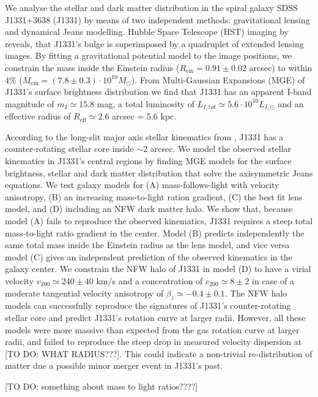 We analyse the stellar and dark matter distribution in the spiral galaxy SDSS J1331+3638 (J1331) by means of two independent methods: gravitational lensing and dynamical Jeans modelling. Hubble Space Telescope (HST) imaging by \citet{SWELLSI} reveals, that J1331's bulge is superimposed by a quadruplet of extended lensing images. By fitting a gravitational potential model to the image positions, we constrain the mass inside the Einstein radius ($R_\text{ein}=0.91\pm0.02$ arcsec) to within 4\% ($M_\text{ein} = (7.8\pm0.3) \cdot 10^{10} M_\odot$). From Multi-Gaussian Expansions (MGE) of J1331's surface brightness distribution we find that J1331 has an apparent I-band magnitude of $m_I \simeq 15.8$ mag, a total luminosity of $L_{I,tot} \simeq 5.6 \cdot 10^{10}L_{I,\odot}$ and an effective radius of $R_\text{eff} \simeq 2.6$ arcsec = 5.6 kpc.

According to the long-slit major axis stellar kinematics from \citet{SWELLSV}, J1331 has a counter-rotating stellar core inside $\sim 2$ arcsec. We model the observed stellar kinematics in J1331's central regions by finding MGE models for the surface brightness, stellar and dark matter distribution that solve the axisymmetric Jeans equations. We test galaxy models for (A) mass-follows-light with velocity anisotropy, (B) an increasing mass-to-light ration gradient, (C) the best fit lens model, and (D) including an NFW dark matter halo. We show that, because model (A) fails to reproduce the observed kinematics, J1331 requires a steep total mass-to-light ratio gradient in the center. Model (B) predicts independently the same total mass inside the Einstein radius as the lens model, and vice versa model (C) gives an independent prediction of the observed kinematics in the galaxy center. We constrain the NFW halo of J1331 in model (D) to have a virial velocity $v_{200} \simeq 240 \pm 40$ km/s and a concentration of $c_{200} \simeq 8 \pm 2$ in case of a moderate tangential velocity anisotropy of $\beta_z \simeq −0.4 \pm 0.1$. The NFW halo models can successfully reproduce the signatures of J1331's counter-rotating stellar core and predict J1331's rotation curve at larger radii. However, all these models were more massive than expected from the gas rotation curve at larger radii, and failed to reproduce the steep drop in measured velocity dispersion at [TO DO: WHAT RADIUS???]. This could indicate a non-trivial re-distribution of matter due a possible minor merger event in J1331's past.

[TO DO: something about mass to light ratios????]
